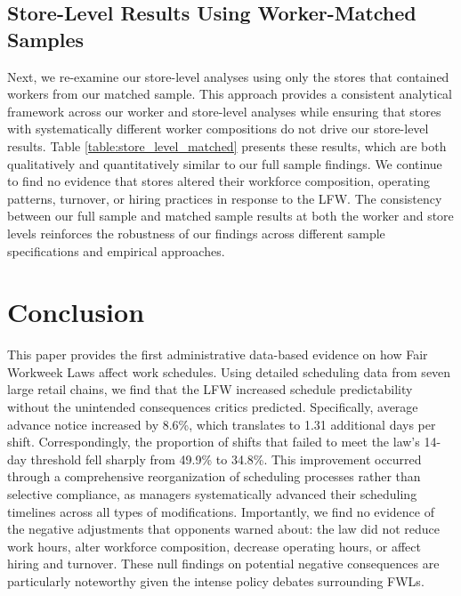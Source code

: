 \documentclass[letterpaper,11pt,leqno]{article}
\theoremstyle{paper}
\begin{document}
\subsection{Store-Level Results Using Worker-Matched Samples}

Next, we re-examine our store-level analyses using only the stores that contained workers from our matched sample. This approach provides a consistent analytical framework across our worker and store-level analyses while ensuring that stores with systematically different worker compositions do not drive our store-level results. Table \ref{table:store_level_matched} presents these results, which are both qualitatively and quantitatively similar to our full sample findings. We continue to find no evidence that stores altered their workforce composition, operating patterns, turnover, or hiring practices in response to the LFW. The consistency between our full sample and matched sample results at both the worker and store levels reinforces the robustness of our findings across different sample specifications and empirical approaches.







\section{Conclusion} \label{sec:conclusions}

This paper provides the first administrative data-based evidence on how Fair Workweek Laws affect work schedules. Using detailed scheduling data from seven large retail chains, we find that the LFW increased schedule predictability without the unintended consequences critics predicted. Specifically, average advance notice increased by 8.6\%, which translates to 1.31 additional days per shift. Correspondingly, the proportion of shifts that failed to meet the law's 14-day threshold fell sharply from 49.9\% to 34.8\%. This improvement occurred through a comprehensive reorganization of scheduling processes rather than selective compliance, as managers systematically advanced their scheduling timelines across all types of modifications. Importantly, we find no evidence of the negative adjustments that opponents warned about: the law did not reduce work hours, alter workforce composition, decrease operating hours, or affect hiring and turnover. These null findings on potential negative consequences are particularly noteworthy given the intense policy debates surrounding FWLs.
\end{document}
